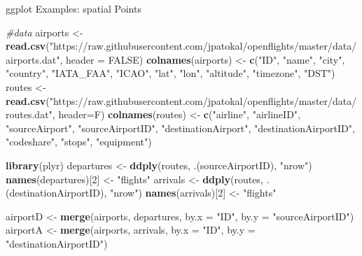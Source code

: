 \documentclass[10pt,ignorenonframetext,]{beamer}
\newenvironment{Shaded}{\begin{snugshade}}{\end{snugshade}}
\newcommand{\KeywordTok}[1]{\textcolor[rgb]{0.13,0.29,0.53}{\textbf{{#1}}}}
\newcommand{\DataTypeTok}[1]{\textcolor[rgb]{0.13,0.29,0.53}{{#1}}}
\newcommand{\DecValTok}[1]{\textcolor[rgb]{0.00,0.00,0.81}{{#1}}}
\newcommand{\StringTok}[1]{\textcolor[rgb]{0.31,0.60,0.02}{{#1}}}
\newcommand{\CommentTok}[1]{\textcolor[rgb]{0.56,0.35,0.01}{\textit{{#1}}}}
\newcommand{\OtherTok}[1]{\textcolor[rgb]{0.56,0.35,0.01}{{#1}}}
\newcommand{\NormalTok}[1]{{#1}}
\begin{document}
\begin{frame}[fragile]{ggplot Examples: spatial Points}

\tiny

\begin{Shaded}
\begin{Highlighting}[]
\CommentTok{#data}
\NormalTok{airports <-}\StringTok{ }\KeywordTok{read.csv}\NormalTok{(}\StringTok{"https://raw.githubusercontent.com/jpatokal/openflights/master/data/airports.dat"}\NormalTok{, }\DataTypeTok{header =} \OtherTok{FALSE}\NormalTok{)}
\KeywordTok{colnames}\NormalTok{(airports) <-}\StringTok{ }\KeywordTok{c}\NormalTok{(}\StringTok{"ID"}\NormalTok{, }\StringTok{"name"}\NormalTok{, }\StringTok{"city"}\NormalTok{, }\StringTok{"country"}\NormalTok{, }\StringTok{"IATA_FAA"}\NormalTok{, }\StringTok{"ICAO"}\NormalTok{, }\StringTok{"lat"}\NormalTok{, }\StringTok{"lon"}\NormalTok{, }\StringTok{"altitude"}\NormalTok{, }\StringTok{"timezone"}\NormalTok{, }\StringTok{"DST"}\NormalTok{)}
\NormalTok{routes <-}\StringTok{ }\KeywordTok{read.csv}\NormalTok{(}\StringTok{"https://raw.githubusercontent.com/jpatokal/openflights/master/data/routes.dat"}\NormalTok{, }\DataTypeTok{header=}\NormalTok{F)}
\KeywordTok{colnames}\NormalTok{(routes) <-}\StringTok{ }\KeywordTok{c}\NormalTok{(}\StringTok{"airline"}\NormalTok{, }\StringTok{"airlineID"}\NormalTok{, }\StringTok{"sourceAirport"}\NormalTok{, }\StringTok{"sourceAirportID"}\NormalTok{, }\StringTok{"destinationAirport"}\NormalTok{, }
                      \StringTok{"destinationAirportID"}\NormalTok{, }\StringTok{"codeshare"}\NormalTok{, }\StringTok{"stops"}\NormalTok{, }\StringTok{"equipment"}\NormalTok{)}

\KeywordTok{library}\NormalTok{(plyr)}
\NormalTok{departures <-}\StringTok{ }\KeywordTok{ddply}\NormalTok{(routes, .(sourceAirportID), }\StringTok{"nrow"}\NormalTok{)}
\KeywordTok{names}\NormalTok{(departures)[}\DecValTok{2}\NormalTok{] <-}\StringTok{ "flights"}
\NormalTok{arrivals <-}\StringTok{ }\KeywordTok{ddply}\NormalTok{(routes, .(destinationAirportID), }\StringTok{"nrow"}\NormalTok{)}
\KeywordTok{names}\NormalTok{(arrivals)[}\DecValTok{2}\NormalTok{] <-}\StringTok{ "flights"}

\NormalTok{airportD <-}\StringTok{ }\KeywordTok{merge}\NormalTok{(airports, departures, }\DataTypeTok{by.x =} \StringTok{"ID"}\NormalTok{, }\DataTypeTok{by.y =} \StringTok{"sourceAirportID"}\NormalTok{)}
\NormalTok{airportA <-}\StringTok{ }\KeywordTok{merge}\NormalTok{(airports, arrivals, }\DataTypeTok{by.x =} \StringTok{"ID"}\NormalTok{, }\DataTypeTok{by.y =} \StringTok{"destinationAirportID"}\NormalTok{)}


\end{Highlighting}
\end{Shaded}
\end{frame}
\end{document}
